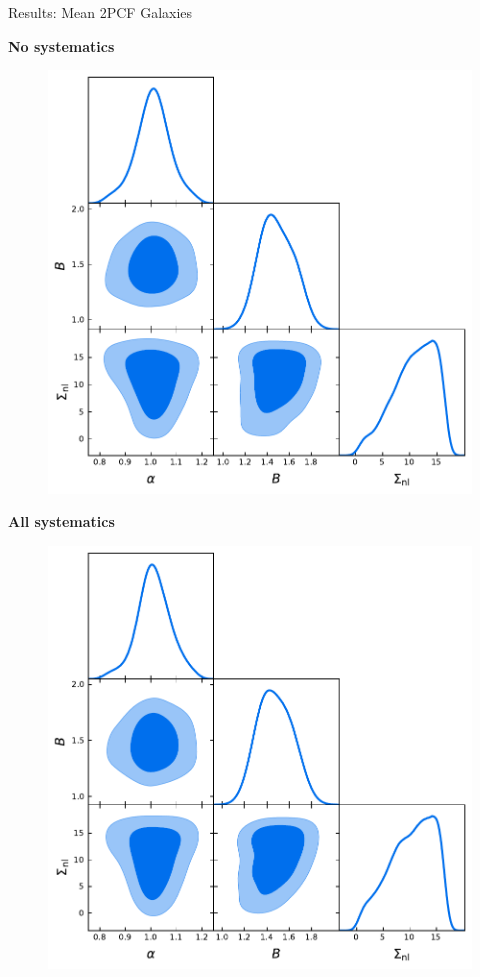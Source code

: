 \documentclass{beamer}
\begin{document}
\begin{frame}[allowframebreaks]{Results: Mean 2PCF Galaxies}
\begin{multicols}{2}
\textbf{No systematics}
\begin{figure}
	\centering
	\includegraphics[width=0.9\linewidth]{plots/TwoPCF_mockavg_nosyst_v7_gal_cbz_triplot}
\end{figure}
\textbf{All systematics}
\begin{figure}
	\centering
	\includegraphics[width=0.9\linewidth]{plots/TwoPCF_mockavg_allsyst_v7_gal_cbz_triplot}

\end{figure}
\end{multicols}
\end{frame}
\end{document}
